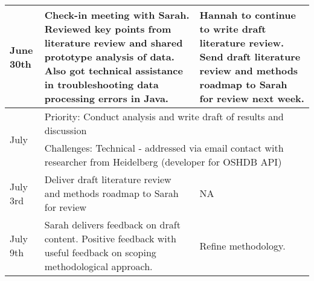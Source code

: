 \begin{singlespace}
\begin{longtable}{|p{2cm}|p{5cm}|p{5cm}}
June 30th               & Check-in meeting with Sarah. Reviewed key points from literature review and shared prototype analysis of data. Also got technical assistance in troubleshooting data processing errors in Java.                                                       & Hannah to continue to write draft literature review. Send draft literature review and methods roadmap to Sarah for review next week.                                                                                        \\ 
\hline
\multirow{2}{*}{July}   & \multicolumn{2}{p{8cm}}{Priority: Conduct analysis and write draft of results and discussion}                                                                                                                                                                                                                                                                                                                                                                                            \\
                        & \multicolumn{2}{p{8cm}}{Challenges: Technical - addressed via email contact with researcher from Heidelberg (developer for OSHDB API)}                                                                                                                                                                                                                                                                                                                                                   \\ 
\hline
July 3rd                & Deliver draft literature review and methods roadmap to Sarah for review                                                                                                                                                                               & NA                                                                                                                                                                                                                          \\
July 9th                & Sarah delivers feedback on draft content. Positive feedback with useful feedback on scoping methodological approach.                                                                                                                                  & Refine methodology.                                                                                                                                                                                                         \\

\end{longtable}
\end{singlespace}
